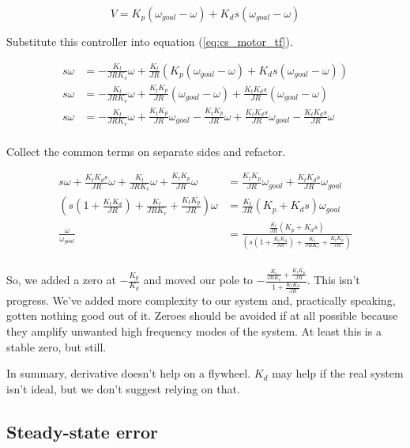 \begin{equation*}
  V = K_p (\omega_{goal} - \omega) + K_d s (\omega_{goal} - \omega)
\end{equation*}

Substitute this controller into equation (\ref{eq:cs_motor_tf}).

\begin{align*}
  s \omega &= -\frac{K_t}{JRK_v} \omega + \frac{K_t}{JR}
    \left(K_p (\omega_{goal} - \omega) + K_d s (\omega_{goal} - \omega)\right)
    \\
  s \omega &= -\frac{K_t}{JRK_v} \omega + \frac{K_t K_p}{JR}
    (\omega_{goal} - \omega) + \frac{K_t K_d s}{JR} (\omega_{goal} - \omega) \\
  s \omega &= -\frac{K_t}{JRK_v} \omega + \frac{K_t K_p}{JR} \omega_{goal} -
    \frac{K_t K_p}{JR} \omega + \frac{K_t K_d s}{JR} \omega_{goal} -
    \frac{K_t K_d s}{JR} \omega \\
\end{align*}

Collect the common terms on separate sides and refactor.

\begin{align*}
  s \omega + \frac{K_t K_d s}{JR} \omega + \frac{K_t}{JRK_v} \omega +
    \frac{K_t K_p}{JR} \omega &= \frac{K_t K_p}{JR} \omega_{goal} +
    \frac{K_t K_d s}{JR} \omega_{goal} \\
  \left(s \left(1 + \frac{K_t K_d}{JR}\right) + \frac{K_t}{JRK_v} +
    \frac{K_t K_p}{JR}\right) \omega &= \frac{K_t}{JR}
    \left(K_p + K_d s\right) \omega_{goal} \\
  \frac{\omega}{\omega_{goal}} &= \frac{\frac{K_t}{JR}
    \left(K_p + K_d s\right)}{\left(s \left(1 + \frac{K_t K_d}{JR}\right) +
    \frac{K_t}{JRK_v} + \frac{K_t K_p}{JR}\right)} \\
\end{align*}

So, we added a zero at $-\frac{K_p}{K_d}$ and moved our pole to
$-\frac{\frac{K_t}{JRK_v} + \frac{K_t K_p}{JR}}{1 + \frac{K_t K_d}{JR}}$. This
isn't progress. We've added more complexity to our system and, practically
speaking, gotten nothing good out of it. Zeroes should be avoided if at all
possible because they amplify unwanted high frequency modes of the system. At
least this is a stable zero, but still.

In summary, derivative doesn't help on a flywheel. $K_d$ may help if the real
system isn't ideal, but we don't suggest relying on that.

\subsection{Steady-state error}

